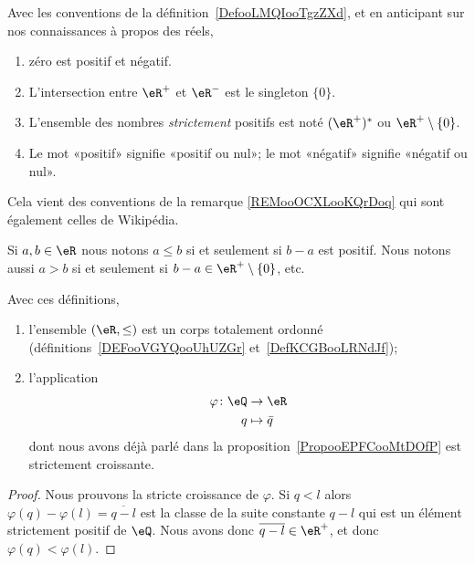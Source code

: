 \begin{normaltext}\label{REMooOCXLooKQrDoq}
    Avec les conventions de la définition~\ref{DefooLMQIooTgzZXd}, et en anticipant sur nos connaissances à propos des réels,
    \begin{enumerate}
        \item
            zéro est positif et négatif.
        \item
            L'intersection entre \( \eR^+\) et \( \eR^-\) est le singleton \( \{ 0 \}\).
        \item
            L'ensemble des nombres \emph{strictement} positifs est noté \( (\eR^+)^*\) ou \( \eR^+\setminus\{ 0 \}\).
        \item
            Le mot «positif» signifie «positif ou nul»; le mot «négatif» signifie «négatif ou nul».
    \end{enumerate}

    Cela vient des conventions de la remarque \ref{REMooOCXLooKQrDoq} qui sont également celles de Wikipédia\cite{ooSBSSooTlnuKi}.
\end{normaltext}


\begin{lemmaDef}       \label{LemooRordonne}
    Si \( a,b\in \eR\) nous notons \( a\leq b\) si et seulement si \( b-a\) est positif. Nous notons aussi \( a>b\) si et seulement si \( b-a\in \eR^+\setminus\{ 0 \}\), etc.

    Avec ces définitions,
    \begin{enumerate}
        \item       \label{ITEMooNHIUooMQHZKZ}
            l'ensemble \( (\eR,\leq)\) est un corps totalement ordonné (définitions~\ref{DEFooVGYQooUhUZGr} et~\ref{DefKCGBooLRNdJf});
        \item
            l'application
            \begin{equation}
                \begin{aligned}
                    \varphi\colon \eQ&\to \eR \\
                    q&\mapsto \bar q
                \end{aligned}
            \end{equation}
            dont nous avons déjà parlé dans la proposition~\ref{PropooEPFCooMtDOfP} est strictement croissante.
    \end{enumerate}
\end{lemmaDef}

\begin{proof}
    Nous prouvons la stricte croissance de \( \varphi\). Si \( q< l\) alors \( \varphi(q)-\varphi(l)=\overline{ q-l }\) est la classe de la suite constante \( q-l\) qui est un élément strictement positif de \( \eQ\). Nous avons donc \( \overline{ q-l }\in \eR^+\), et donc \( \varphi(q)<\varphi(l)\).
\end{proof}

